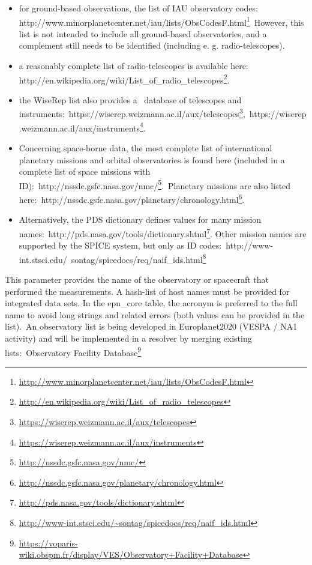 \documentclass[11pt,a4paper]{ivoa}
\begin{document}
\begin{itemize}
\item for ground-based observations, the list of IAU observatory codes: http://www.minorplanetcenter.net/iau/lists/ObsCodesF.html\footnote{\url{http://www.minorplanetcenter.net/iau/lists/ObsCodesF.html}} However, this list is not intended to include all ground-based observatories, and a complement still needs to be identified (including e. g. radio-telescopes). 
\item a reasonably complete list of radio-telescopes is available here: http://en.wikipedia.org/wiki/List\_of\_radio\_telescopes\footnote{\url{http://en.wikipedia.org/wiki/List_of_radio_telescopes}}.
\item the WiseRep list also provides a  database of telescopes and instruments: https://wiserep.weizmann.ac.il/aux/telescopes\footnote{\url{https://wiserep.weizmann.ac.il/aux/telescopes}}, https://wiserep.weizmann.ac.il/aux/instruments\footnote{\url{https://wiserep.weizmann.ac.il/aux/instruments}}. 
\item Concerning space-borne data, the most complete list of international planetary missions and orbital observatories is found here (included in a complete list of space missions with ID): http://nssdc.gsfc.nasa.gov/nmc/\footnote{\url{http://nssdc.gsfc.nasa.gov/nmc/}}. Planetary missions are also listed here: http://nssdc.gsfc.nasa.gov/planetary/chronology.html\footnote{\url{http://nssdc.gsfc.nasa.gov/planetary/chronology.html}}. 
\item Alternatively, the PDS dictionary defines values for many mission names: http://pds.nasa.gov/tools/dictionary.shtml\footnote{\url{http://pds.nasa.gov/tools/dictionary.shtml}}. Other mission names are supported by the SPICE system, but only as ID codes: http://www-int.stsci.edu/~sontag/spicedocs/req/naif\_ids.html\footnote{\url{http://www-int.stsci.edu/~sontag/spicedocs/req/naif_ids.html}}
\end{itemize}

This parameter provides the name of the observatory or spacecraft that performed the measurements. A hash-list of host names must be provided for integrated data sets. In the epn\_core table, the acronym is preferred to the full name to avoid long strings and related errors (both values can be provided in the list). An observatory list is being developed in Europlanet2020 (VESPA / NA1 activity) and will be implemented in a resolver by merging existing lists: Observatory Facility Database\footnote{\url{https://voparis-wiki.obspm.fr/display/VES/Observatory+Facility+Database}}
\end{document}
